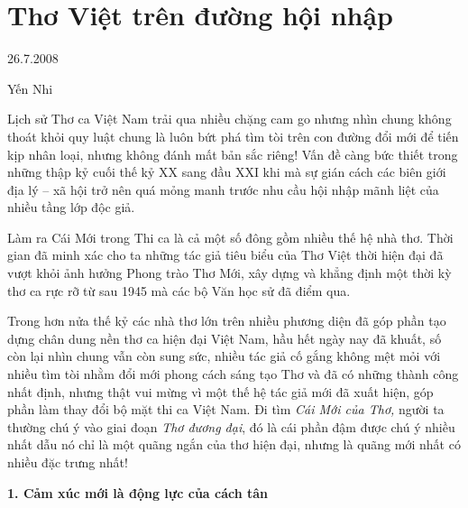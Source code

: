 \documentclass[../main.tex]{subfiles}
\begin{document}
\chapter{Thơ Việt trên đường hội nhập}

\begin{metadata}

\begin{flushright}26.7.2008\end{flushright}

Yến Nhi



\end{metadata}

\begin{multicols}{2}

Lịch sử Thơ ca Việt Nam trải qua nhiều chặng cam go nhưng nhìn chung không thoát khỏi quy luật chung là luôn bứt phá tìm tòi trên con đường đổi mới để tiến kịp nhân loại, nhưng không đánh mất bản sắc riêng! Vấn đề càng bức thiết trong những thập kỷ cuối thế kỷ XX sang đầu XXI khi mà sự gián cách các biên giới địa lý – xã hội trở nên quá mỏng manh trước nhu cầu hội nhập mãnh liệt của nhiều tầng lớp độc giả. 
 
Làm ra Cái Mới trong Thi ca là cả một số đông gồm nhiều thế hệ nhà thơ. Thời gian đã minh xác cho ta những tác giả tiêu biểu của Thơ Việt thời hiện đại đã vượt khỏi ảnh hưởng Phong trào Thơ Mới, xây dựng và khẳng định một thời kỳ thơ ca rực rỡ từ sau 1945 mà các bộ Văn học sử đã điểm qua. 
 
Trong hơn nửa thế kỷ các nhà thơ lớn trên nhiều phương diện đã góp phần tạo dựng chân dung nền thơ ca  hiện đại Việt Nam, hầu hết ngày nay đã khuất, số còn lại nhìn chung vẫn còn sung sức, nhiều tác giả cố gắng không mệt mỏi với nhiều tìm tòi nhằm đổi mới phong cách sáng tạo Thơ và đã có những thành công nhất định, nhưng thật vui mừng vì một thế hệ tác giả mới đã xuất hiện, góp phần làm thay đổi bộ mặt thi ca Việt Nam. Đi tìm\textit{ Cái Mới của Thơ,} người ta thường chú ý vào giai đoạn \textit{Thơ đương đại}, đó là cái phần đậm được chú ý nhiều nhất dẫu nó chỉ là một quãng ngắn của thơ hiện đại, nhưng là quãng mới nhất có nhiều đặc trưng nhất! 

 
\textbf{1. Cảm xúc mới là động lực của cách tân} 
 

\end{multicols}
\end{document}
